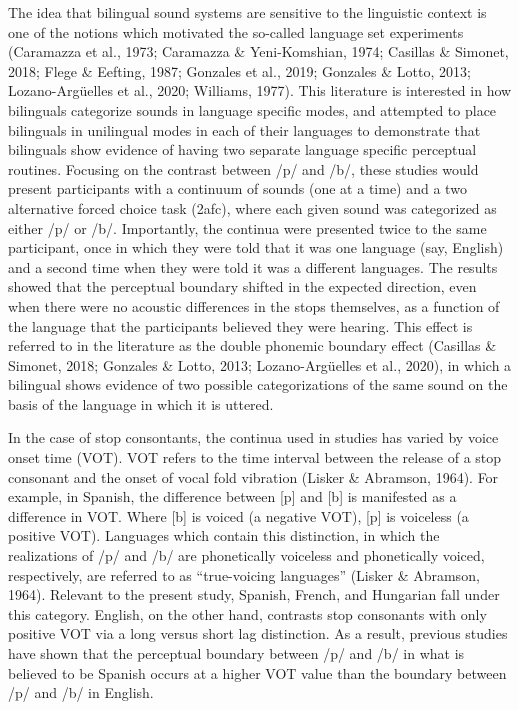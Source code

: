 \documentclass[
  man,floatsintext]{apa6}
\begin{document}
The idea that bilingual sound systems are sensitive to the linguistic context is one of the notions which motivated the so-called language set experiments
(Caramazza et al., 1973; Caramazza \& Yeni-Komshian, 1974; Casillas \& Simonet, 2018; Flege \& Eefting, 1987; Gonzales et al., 2019; Gonzales \& Lotto, 2013; Lozano-Argüelles et al., 2020; Williams, 1977).
This literature is interested in how bilinguals categorize sounds in language specific modes, and attempted to place bilinguals in unilingual modes in each of their languages to demonstrate that bilinguals show evidence of having two separate language specific perceptual routines.
Focusing on the contrast between /p/ and /b/, these studies would present participants with a continuum of sounds (one at a time) and a two alternative forced choice task (2afc), where each given sound was categorized as either /p/ or /b/.
Importantly, the continua were presented twice to the same participant, once in which they were told that it was one language (say, English) and a second time when they were told it was a different languages.
The results showed that the perceptual boundary shifted in the expected direction, even when there were no acoustic differences in the stops themselves, as a function of the language that the participants believed they were hearing.
This effect is referred to in the literature as the double phonemic boundary effect (Casillas \& Simonet, 2018; Gonzales \& Lotto, 2013; Lozano-Argüelles et al., 2020), in which a bilingual shows evidence of two possible categorizations of the same sound on the basis of the language in which it is uttered.

In the case of stop consontants, the continua used in studies has varied by voice onset time (VOT).
VOT refers to the time interval between the release of a stop consonant and the onset of vocal fold vibration (Lisker \& Abramson, 1964).
For example, in Spanish, the difference between {[}p{]} and {[}b{]} is manifested as a difference in VOT.
Where {[}b{]} is voiced (a negative VOT), {[}p{]} is voiceless (a positive VOT).
Languages which contain this distinction, in which the realizations of /p/ and /b/ are phonetically voiceless and phonetically voiced, respectively, are referred to as ``true-voicing languages'' (Lisker \& Abramson, 1964).
Relevant to the present study, Spanish, French, and Hungarian fall under this category.
English, on the other hand, contrasts stop consonants with only positive VOT via a long versus short lag distinction.
As a result, previous studies have shown that the perceptual boundary between /p/ and /b/ in what is believed to be Spanish occurs at a higher VOT value than the boundary between /p/ and /b/ in English.
\end{document}
